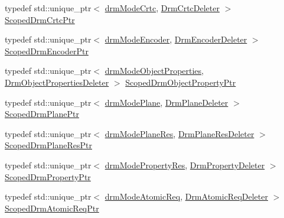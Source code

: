\begin{DoxyCompactItemize}
\item 
typedef std\+::unique\+\_\+ptr$<$ \mbox{\hyperlink{drmscopedtypes_8h_a847e3d935cfc3d51910e1a3934e88a1b}{drm\+Mode\+Crtc}}, \mbox{\hyperlink{structhwcomposer_1_1DrmCrtcDeleter}{Drm\+Crtc\+Deleter}} $>$ \mbox{\hyperlink{namespacehwcomposer_a9571d0c874674e369f17aa93c5d863e8}{Scoped\+Drm\+Crtc\+Ptr}}
\item 
typedef std\+::unique\+\_\+ptr$<$ \mbox{\hyperlink{drmscopedtypes_8h_a6a3ef235514bbe2e938575fc4d2c919c}{drm\+Mode\+Encoder}}, \mbox{\hyperlink{structhwcomposer_1_1DrmEncoderDeleter}{Drm\+Encoder\+Deleter}} $>$ \mbox{\hyperlink{namespacehwcomposer_a8bf37e42152b3284fd9f087f8c02cd5c}{Scoped\+Drm\+Encoder\+Ptr}}
\item 
typedef std\+::unique\+\_\+ptr$<$ \mbox{\hyperlink{drmscopedtypes_8h_a5b9e41a0b21c1a9017be96cfdf9f049c}{drm\+Mode\+Object\+Properties}}, \mbox{\hyperlink{structhwcomposer_1_1DrmObjectPropertiesDeleter}{Drm\+Object\+Properties\+Deleter}} $>$ \mbox{\hyperlink{namespacehwcomposer_ace195c2e057b634efb3013a5a4413799}{Scoped\+Drm\+Object\+Property\+Ptr}}
\item 
typedef std\+::unique\+\_\+ptr$<$ \mbox{\hyperlink{drmscopedtypes_8h_a41627c0f0f83a8fc263e592ae28ae6b4}{drm\+Mode\+Plane}}, \mbox{\hyperlink{structhwcomposer_1_1DrmPlaneDeleter}{Drm\+Plane\+Deleter}} $>$ \mbox{\hyperlink{namespacehwcomposer_a65038450f2af31da16cb0817ad1725c8}{Scoped\+Drm\+Plane\+Ptr}}
\item 
typedef std\+::unique\+\_\+ptr$<$ \mbox{\hyperlink{drmscopedtypes_8h_abc090a2f00ebaea9426f9a5636f40994}{drm\+Mode\+Plane\+Res}}, \mbox{\hyperlink{structhwcomposer_1_1DrmPlaneResDeleter}{Drm\+Plane\+Res\+Deleter}} $>$ \mbox{\hyperlink{namespacehwcomposer_a0f1486ef5a49e79373fe75dfd767b85f}{Scoped\+Drm\+Plane\+Res\+Ptr}}
\item 
typedef std\+::unique\+\_\+ptr$<$ \mbox{\hyperlink{drmscopedtypes_8h_a4fb7f6f576c5cfbc7ee86d566c5c8673}{drm\+Mode\+Property\+Res}}, \mbox{\hyperlink{structhwcomposer_1_1DrmPropertyDeleter}{Drm\+Property\+Deleter}} $>$ \mbox{\hyperlink{namespacehwcomposer_ae4038d517ff95af940c1f9cdf40e3834}{Scoped\+Drm\+Property\+Ptr}}
\item 
typedef std\+::unique\+\_\+ptr$<$ \mbox{\hyperlink{drmscopedtypes_8h_a6d8c8b40283089c14de1005f7fb2ee0c}{drm\+Mode\+Atomic\+Req}}, \mbox{\hyperlink{structhwcomposer_1_1DrmAtomicReqDeleter}{Drm\+Atomic\+Req\+Deleter}} $>$ \mbox{\hyperlink{namespacehwcomposer_a1db01e0534b5b990ac7d35376c4b7e03}{Scoped\+Drm\+Atomic\+Req\+Ptr}}
\end{DoxyCompactItemize}
